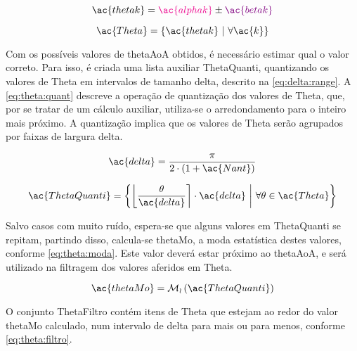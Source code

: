 \begin{equation} \label{eq:theta:pmk}
	\ac{thetak} = \textcolor{cmyk_M}{\ac{alphak}}\pm \textcolor{Purple}{\ac{betak}}
\end{equation}

\begin{equation} \label{eq:theta:conj}
	\ac{Theta} = \left\{\ac{thetak} ~\middle\vert~ \forall \ac{k}\right\}
\end{equation}


Com os possíveis valores de \ac{thetaAoA} obtidos, é necessário estimar qual o valor correto.
Para isso, é criada uma lista auxiliar \ac{ThetaQuanti}, quantizando os valores de \ac{Theta} em intervalos de tamanho \ac{delta}, descrito na \autoref{eq:delta:range}.
A \autoref{eq:theta:quant} descreve a operação de quantização dos valores de \ac{Theta}, que, por se tratar de um cálculo auxiliar, utiliza-se o arredondamento para o inteiro mais próximo.
A quantização implica que os valores de \ac{Theta} serão agrupados por faixas de largura \ac{delta}.

\begin{equation} \label{eq:delta:range}
    \ac{delta} = \frac{\pi}{2 \cdot \left( 1 + \ac{Nant} \right)}
\end{equation}

\begin{equation} \label{eq:theta:quant}
    \ac{ThetaQuanti} =
    \left\{\left\lfloor\frac{\theta}{\ac{delta}}\right\rceil\cdot\ac{delta} ~\middle\vert~ \forall \theta \in \ac{Theta}  \right\}
\end{equation}

Salvo casos com muito ruído, espera-se que alguns valores em \ac{ThetaQuanti} se repitam, partindo disso, calcula-se \ac{thetaMo}, a moda estatística destes valores, conforme \autoref{eq:theta:moda}.
Este valor deverá estar próximo ao \ac{thetaAoA}, e será utilizado na filtragem dos valores aferidos em \ac{Theta}.

\begin{equation} \label{eq:theta:moda}
    \ac{thetaMo} = \operatorname{\mathcal{M_o}}\left( \ac{ThetaQuanti}  \right)
\end{equation}

O conjunto \ac{ThetaFiltro} contém itens de \ac{Theta} que estejam ao redor do valor \ac{thetaMo} calculado, num intervalo de \ac{delta} para mais ou para menos, conforme \autoref{eq:theta:filtro}.


